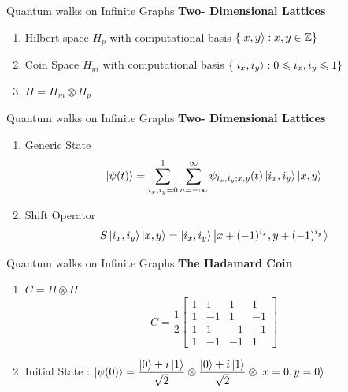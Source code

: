 \documentclass[xcolor=svgnames]{beamer}
\def\leq{\leqslant}
\newcommand{\tens}[1]{
  \mathbin{\mathop{\otimes}\limits_{#1}}}
\begin{document}
\begin{frame}{Quantum walks on Infinite Graphs}
\textbf{ Two- Dimensional Lattices}
\begin{enumerate}
    \item Hilbert space $H_p$ with computational basis $\{\ket{x,y} : x,y \in \mathbb{Z \}}$
    \item Coin Space $H_m$ with computational basis $\{\ket{i_x,i_y} : 0 \leq i_x,i_y \leq 1 \}$
    \item $H = H_m \tens{}  H_p$
\end{enumerate}
    
\end{frame}

\begin{frame}{Quantum walks on Infinite Graphs}
\textbf{ Two- Dimensional Lattices}
\begin{enumerate}
    \item Generic State
    $$ \ket{\psi(t)} = \sum_{i_x,i_y=0}^{1}\sum_{n = -\infty}^{\infty} \psi_{i_x,i_y;x,y}(t)\ket{i_x,i_y}\ket{x,y}$$
    \item Shift Operator
            $$S\ket{i_x,i_y}\ket{x,y} = \ket{i_x,i_y}\ket{x+(-1)^{i_x},y+(-1)^{i_y}}$$
    
\end{enumerate}
    
\end{frame}

\begin{frame}{Quantum walks on Infinite Graphs}
\textbf{ The Hadamard Coin}
\begin{enumerate}
    \item $C = H \tens{} H$
    $$C = \frac{1}{2}\begin{bmatrix}
                                1 & 1 & 1 & 1\\
                                    1 & -1 & 1 & -1\\
                                    1 & 1 & -1 & -1\\
                                    1 & -1 & -1 & 1
                                    \end{bmatrix}$$
    \item Initial State : $\ket{\psi(0)} = \dfrac{\ket{0}+i\ket{1}}{\sqrt{2}} \tens{} \dfrac{\ket{0} +i\ket{1}}{\sqrt{2}} \tens{} \ket{x=0,y=0}$
    
\end{enumerate}
    
\end{frame}
\end{document}

